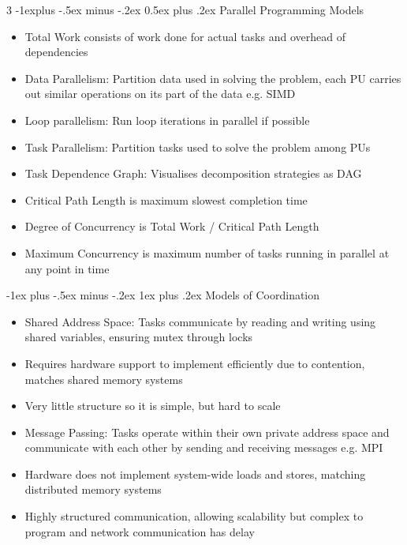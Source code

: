 \documentclass[10pt, landscape]{article}
\makeatletter
\renewcommand{\section}{\@startsection{section}{1}{0mm}%
                                {-1ex plus -.5ex minus -.2ex}%
                                {0.5ex plus .2ex}%
                                {\normalfont\large\bfseries}}
\renewcommand{\section}{\@startsection{section}{2}{0mm}%
                                {-1explus -.5ex minus -.2ex}%
                                {0.5ex plus .2ex}%
                                {\normalfont\normalsize\bfseries}}
\renewcommand{\subsection}{\@startsection{subsection}{3}{0mm}%
                                {-1ex plus -.5ex minus -.2ex}%
                                {1ex plus .2ex}%
                                {\normalfont\small\bfseries}}%
\makeatother
\begin{document}
\begin{multicols*}{3}
\section{Parallel Programming Models}
\begin{itemize}
    \item Total Work consists of work done for actual tasks and overhead of dependencies
    \item Data Parallelism: Partition data used in solving the problem, each PU carries out similar operations on its part of the data e.g. SIMD
    \item Loop parallelism: Run loop iterations in parallel if possible
    \item Task Parallelism: Partition tasks used to solve the problem among PUs
    \item Task Dependence Graph: Visualises decomposition strategies as DAG
    \item Critical Path Length is maximum slowest completion time
    \item Degree of Concurrency is Total Work / Critical Path Length
    \item Maximum Concurrency is maximum number of tasks running in parallel at any point in time
\end{itemize}

\subsection{Models of Coordination}
\begin{itemize}
    \item Shared Address Space: Tasks communicate by reading and writing using shared variables, ensuring mutex through locks
    \item Requires hardware support to implement efficiently due to contention, matches shared memory systems
    \item Very little structure so it is simple, but hard to scale
    \item Message Passing: Tasks operate within their own private address space and communicate with each other by sending and receiving messages e.g. MPI
    \item Hardware does not implement system-wide loads and stores, matching distributed memory systems
    \item Highly structured communication, allowing scalability but complex to program and network communication has delay
\end{itemize}


\end{multicols*}
\end{document}
